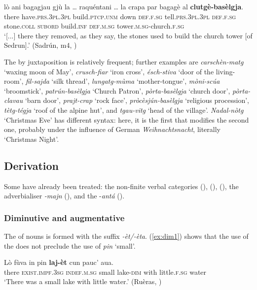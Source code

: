 \ea
\label{ex:clutgebaselgja1}
\gll[...] lò ani bagagjau gjù la … raquéntani … la crapa par bagagè al \textbf{clutgè-basèlgja}.\\
{} there have.\textsc{prs.3pl.3pl} build.\textsc{ptcp.unm} down \textsc{def.f.sg} {} tell.\textsc{prs.3pl.3pl} {} \textsc{def.f.sg} stone.\textsc{coll} \textsc{subord} build.\textsc{inf}  \textsc{def.m.sg} tower.\textsc{m.sg}-church.\textsc{f.sg}  \\
\glt `[...] there they removed, as they say, the stones used to build the church tower [of Sedrun].' (Sadrún, m4, )
\z

The  by juxtaposition is relatively frequent; further examples are \textit{carschèn-matg} `waxing moon of May', \textit{crusch-fiar} `iron cross', \textit{ésch-stiva} `door of the living-room', \textit{fil-sajda} `silk thread', \textit{lungatg-mùma} `mother-tongue', \textit{mòni-scúa} `broomstick', \textit{patrún-basèlgja} `Church Patron', \textit{pòrta-basèlgja} `church door', \textit{pòrta-clavau} `barn door', \textit{prajt-crap} `rock face', \textit{pròcèsjún-basèlgja} `religious procession', \textit{tètg-tégja} `roof of the alpine hut', and \textit{tgau-vitg} `head of the village'. \textit{Nadal-nòtg} `Christmas Eve' has different syntax: here, it is the first  that modifies the second one, probably under the influence of German \textit{Weihnachtsnacht}, literally `Christmas Night'.

\subsection{Derivation}\label{sec:7.2.2}
Some  have already been treated: the non-finite verbal categories  (),  (),  (), the adverbialiser \textit{-majn} (), and the  -\textit{antá} ().


\subsubsection{Diminutive and augmentative}\label{sec:7.2.2.1}

The  of nouns is formed with the suffix \textit{-èt/-èta}. (\ref{ex:dim1}) shows that the use of the  does not preclude the use of \textit{pin} `small'.

\ea\label{ex:dim1}
\gll    Lò fùva in pin \textbf{laj-èt} cun pauc’ aua.\\
     there \textsc{exist.impf.3sg} \textsc{indef.m.sg} small lake-\textsc{dim} with little.\textsc{f.sg} water \\
\glt `There was a small lake with little water.' (Ruèras, \citealt[62]{Büchli1966})
\z

